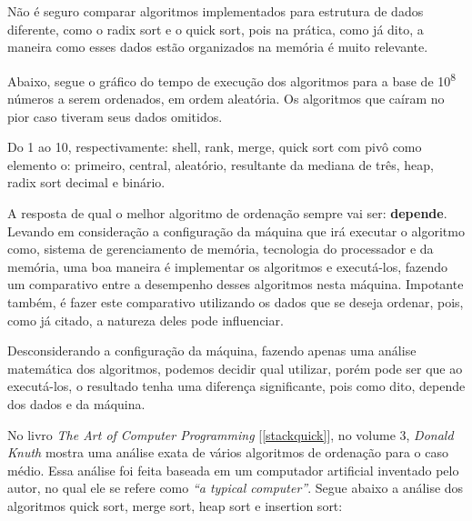 \documentclass[fleqn,10pt]{SelfArx} %
\begin{document}
Não é seguro comparar algoritmos implementados para estrutura de dados diferente, como o radix sort e o quick sort, 
pois na prática, como já dito, a maneira como esses dados estão organizados na memória é muito relevante.

Abaixo, segue o gráfico do tempo de execução dos algoritmos para a base de 10\textsuperscript{8} números a serem 
ordenados, em ordem aleatória. Os algoritmos que caíram no pior caso tiveram seus dados omitidos.\newline

{\setlength{\parindent}{-0.5em}
}

Do 1 ao 10, respectivamente: shell, rank, merge, quick sort com pivô como elemento o: primeiro, central, aleatório, resultante da mediana de três, heap, radix sort decimal e binário.\newline

A resposta de qual o melhor algoritmo de ordenação sempre vai ser: \textbf{depende}. Levando em consideração a 
configuração da máquina que irá executar o algoritmo como, sistema de gerenciamento de memória, tecnologia do processador 
e da memória, uma boa maneira é implementar os algoritmos e executá-los, fazendo um comparativo entre 
a desempenho desses algoritmos nesta máquina. Impotante também, é fazer este comparativo utilizando os dados que 
se deseja ordenar, pois, como já citado, a natureza deles pode influenciar.

Desconsiderando a configuração da máquina, fazendo apenas uma análise matemática dos algoritmos, podemos decidir 
qual utilizar, porém pode ser que ao executá-los, o resultado tenha uma diferença significante, pois como dito, 
depende dos dados e da máquina.

No livro \emph{The Art of Computer Programming} [\ref{stackquick}], no volume 3, \emph{Donald Knuth} mostra uma análise exata de vários 
algoritmos de ordenação para o caso médio. Essa análise foi feita baseada em um computador artificial inventado pelo 
autor, no qual ele se refere como \emph{``a typical computer''}. Segue abaixo a análise dos algoritmos quick sort, merge 
sort, heap sort e insertion sort: 
\end{document}

